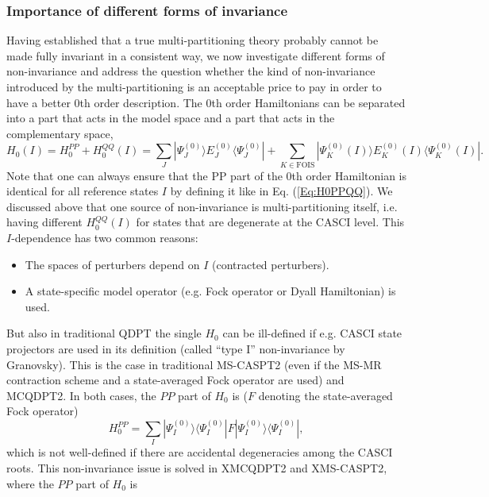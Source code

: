 \subsubsection{Importance of different forms of invariance}
Having established that a true multi-partitioning theory probably cannot be made fully invariant in a consistent way, we now investigate different forms of non-invariance and address the question whether the kind of non-invariance introduced by the multi-partitioning is an acceptable price to pay in order to have a better 0th order description.
The 0th order Hamiltonians can be separated into a part that acts in the model space and a part that acts in the complementary space,
	\begin{equation}
	\label{Eq:H0PPQQ}
	{H_0}(I) = H_0^{PP} + H_0^{QQ}(I) = \sum\limits_J | \Psi _J^{(0)}\rangle E_J^{(0)}\langle \Psi _J^{(0)}| + \sum\limits_{K \in {\text{FOIS}}} | \Psi _K^{(0)}(I)\rangle E_K^{(0)}(I)\langle \Psi _K^{(0)}(I)|.
	\end{equation}
Note that one can always ensure that the PP part of the 0th order Hamiltonian is identical for all reference states $I$ by defining it like in Eq. (\ref{Eq:H0PPQQ}). We discussed above that one source of non-invariance is multi-partitioning itself, i.e. having different $H_0^{QQ}(I)$ for states that are degenerate at the CASCI level. This $I$-dependence has two common reasons:
\begin{itemize}
\item The spaces of perturbers depend on $I$ (contracted perturbers).
\item	A state-specific model operator (e.g. Fock operator or Dyall Hamiltonian) is used.
\end{itemize}
But also in traditional QDPT the single ${H_0}$ can be ill-defined if e.g. CASCI state projectors are used in its definition (called “type I” non-invariance by Granovsky\cite{Grano_2011_}). This is the case in traditional MS-CASPT2 (even if the MS-MR contraction scheme and a state-averaged Fock operator are used) and MCQDPT2. In both cases, the $PP$ part of $H_0$ is ($F$ denoting the state-averaged Fock operator)
\begin{equation}
\label{Eq:H0noninv}
	H_0^{PP} = \sum\limits_I | \Psi _I^{(0)}\rangle \langle \Psi _I^{(0)}|F|\Psi _I^{(0)}\rangle \langle \Psi _I^{(0)}|,
\end{equation}
which is not well-defined if there are accidental degeneracies among the CASCI roots. This non-invariance issue is solved in XMCQDPT2 and XMS-CASPT2, where the $PP$ part of $H_0$ is

